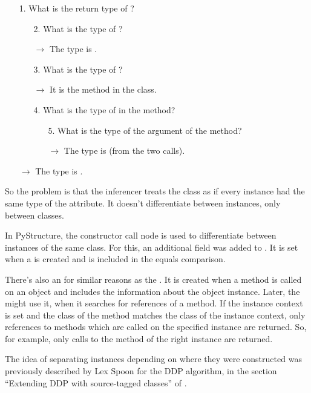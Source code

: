 \documentclass[12pt,halfparskip,DIV11,BCOR10mm]{scrreprt}
\begin{document}
\begin{enumerate}
    \item[1.] What is the return type of ?
    \begin{enumerate}
        \item[2.] What is the type of ?
        \item[] $\rightarrow$ The type is .
        \item[3.] What is the type of ?
        \item[] $\rightarrow$ It is the  method in the  class.
        \item[4.] What is the type of  in the  method?
        \begin{enumerate}
            \item [5.] What is the type of the  argument of the  method?
            \item [] $\rightarrow$ The type is  (from the two  calls).
        \end{enumerate}
    \end{enumerate}
    \item [] $\rightarrow$ The type is .
\end{enumerate}

So the problem is that the inferencer treats the  class as if every instance had the same type of the  attribute. It doesn't differentiate between instances, only between classes.

In PyStructure, the constructor call node is used to differentiate between instances of the same class. For this, an additional field  was added to . It is set when a  is created and is included in the equals comparison.

There's also an  for similar reasons as the . It is created when a method is called on an object and includes the information about the object instance. Later, the  might use it, when it searches for references of a method. If the instance context is set and the class of the method matches the class of the instance context, only references to methods which are called on the specified instance are returned. So, for example, only calls to the  method of the right instance are returned.

The idea of separating instances depending on where they were constructed was previously described by Lex Spoon for the DDP algorithm, in the section ``Extending DDP with source-tagged classes'' of \cite{ddp}.
\end{document}
